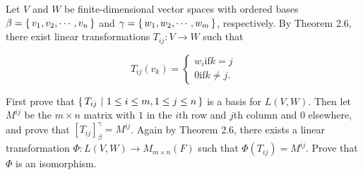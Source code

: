 Let $V$ and $W$ be finite-dimensional vector spaces with ordered bases $\beta = \left\{ \,v_1,v_2,\cdots,v_n \,\right\}$ and $\gamma = \left\{ \,w_1,w_2,\cdots,w_m \,\right\}$, respectively. By Theorem 2.6, there exist linear transformations $T_{ij}:V \rightarrow W$ such that

$$T_{ij}(v_k) = \begin{cases}
	w_i \text{if} k = j\\
	0 \text{if} k \neq j.
\end{cases}$$

First prove that $\left\{ \,T_{ij}~|~1 \leq i \leq m,1\leq j \leq n \,\right\}$ is a basis for $L(V,W)$. Then let $M^{ij}$ be the $m \times n$ matrix with $1$ in the $i$th row and $j$th column and $0$ elsewhere, and prove that $[T_{ij}]^{\gamma}_{\beta} = M^{ij}$. Again by Theorem 2.6, there exists a linear transformation $\Phi :L(V,W) \rightarrow M_{m \times n}(F)$ such that $\Phi (T_{ij}) = M^{ij}$. Prove that $\Phi$ is an isomorphism.


